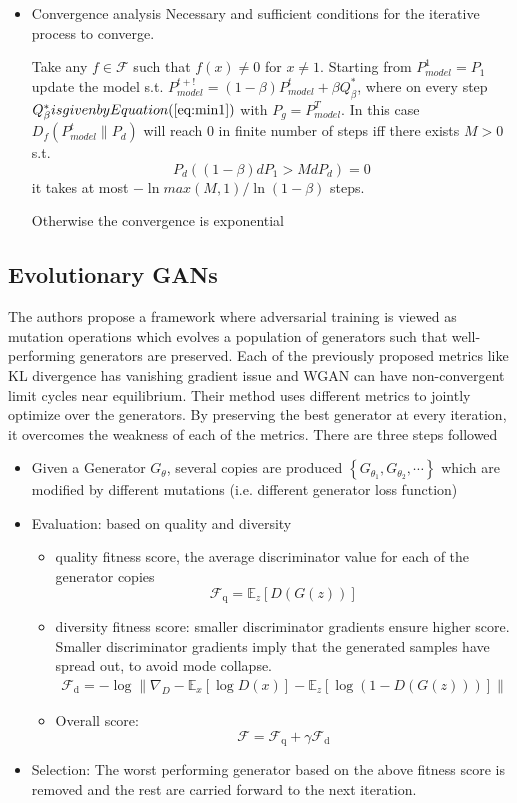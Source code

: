 \begin{itemize}
\item Convergence analysis
Necessary and sufficient conditions for the iterative process to converge.
\begin{theorem}
Take any $f \in \mathcal{F}$ such that $f(x)\neq 0$ for $x\neq 1$. Starting from $P_{model}^1 = P_1$ update the model s.t. $P_{model}^{t+!} = (1-\beta)P_{model}^t + \beta Q_{\beta}^*$, where on every step $Q_{\beta}^* is given by Equation (\ref{eq:min1})$ with $P_g = P^T_{model}$. In this case $D_f(P^t_{model} \parallel P_d)$ will reach 0 in finite number of steps iff there exists $M>0$ s.t.
$$P_d((1 - \beta)dP_1 > MdP_d) = 0$$
it takes at most $-\ln max(M,1)/\ln (1-\beta)$ steps.
\end{theorem}{}
Otherwise the convergence is exponential
\end{itemize}{}
\subsection*{Evolutionary GANs \citep{egan}} The authors propose a framework where adversarial training is viewed as mutation operations which evolves a population of generators such that well-performing generators are preserved. Each of the previously proposed metrics like KL divergence has vanishing gradient issue and WGAN can have non-convergent limit cycles near equilibrium. Their method uses different metrics to jointly optimize over the generators. By preserving the best generator at every iteration, it overcomes the weakness of each of the metrics.
There are three steps followed
\begin{itemize}
    \item Given a Generator $G_{\theta}$, several copies are produced $\left\{G_{\theta_{1}}, G_{\theta_{2}}, \cdots\right\}$ which are modified by different mutations (i.e. different generator loss function)
    \item Evaluation: based on quality and diversity
    \begin{itemize}
        \item quality fitness score, the average discriminator value for each of the generator copies
    $$
\mathcal{F}_{\mathrm{q}}=\mathbb{E}_{z}[D(G(z))]
$$\item diversity fitness score: smaller discriminator gradients ensure higher score. Smaller discriminator gradients imply that the generated samples have spread out, to avoid mode collapse.
\begin{equation*}
    \begin{aligned}
    \mathcal{F}_{\mathrm{d}}=- \log \|  \nabla_{D}-\mathbb{E}_{x}[\log D(x)] 
     - \mathbb{E}_{z}[\log (1-D(G(z)))] \|
    \end{aligned}{}
\end{equation*}{}

\item Overall score:
$$
\mathcal{F}=\mathcal{F}_{\mathrm{q}}+\gamma \mathcal{F}_{\mathrm{d}}
$$
    \end{itemize}{}
    \item Selection: The worst performing generator based on the above fitness score is removed and the rest are carried forward to the next iteration.
\end{itemize}{}

